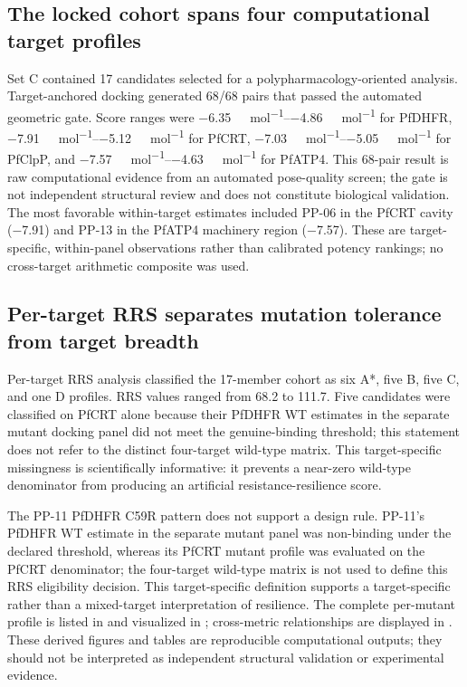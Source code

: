 \documentclass[journal=jcisd8,manuscript=article]{achemso}
\begin{document}
\subsection{The locked cohort spans four computational target profiles}
Set C contained 17 candidates selected for a polypharmacology-oriented analysis. Target-anchored docking generated \num{68}/\num{68} pairs that passed the automated geometric gate. Score ranges were \qtyrange{-6.35}{-4.86}{\kilo\calorie\per\mole} for PfDHFR, \qtyrange{-7.91}{-5.12}{\kilo\calorie\per\mole} for PfCRT, \qtyrange{-7.03}{-5.05}{\kilo\calorie\per\mole} for PfClpP, and \qtyrange{-7.57}{-4.63}{\kilo\calorie\per\mole} for PfATP4. This 68-pair result is raw computational evidence from an automated pose-quality screen; the gate is not independent structural review and does not constitute biological validation. The most favorable within-target estimates included PP-06 in the PfCRT cavity (\num{-7.91}) and PP-13 in the PfATP4 machinery region (\num{-7.57}). These are target-specific, within-panel observations rather than calibrated potency rankings; no cross-target arithmetic composite was used.

\subsection{Per-target RRS separates mutation tolerance from target breadth}
Per-target RRS analysis classified the 17-member cohort as six A*, five B, five C, and one D profiles. RRS values ranged from \num{68.2} to \num{111.7}. Five candidates were classified on PfCRT alone because their PfDHFR WT estimates in the separate mutant docking panel did not meet the genuine-binding threshold; this statement does not refer to the distinct four-target wild-type matrix. This target-specific missingness is scientifically informative: it prevents a near-zero wild-type denominator from producing an artificial resistance-resilience score.

The PP-11 PfDHFR C59R pattern does not support a design rule. PP-11's PfDHFR WT estimate in the separate mutant panel was non-binding under the declared threshold, whereas its PfCRT mutant profile was evaluated on the PfCRT denominator; the four-target wild-type matrix is not used to define this RRS eligibility decision. This target-specific definition supports a target-specific rather than a mixed-target interpretation of resilience. The complete per-mutant profile is listed in  and visualized in ; cross-metric relationships are displayed in . These derived figures and tables are reproducible computational outputs; they should not be interpreted as independent structural validation or experimental evidence.
\end{document}
